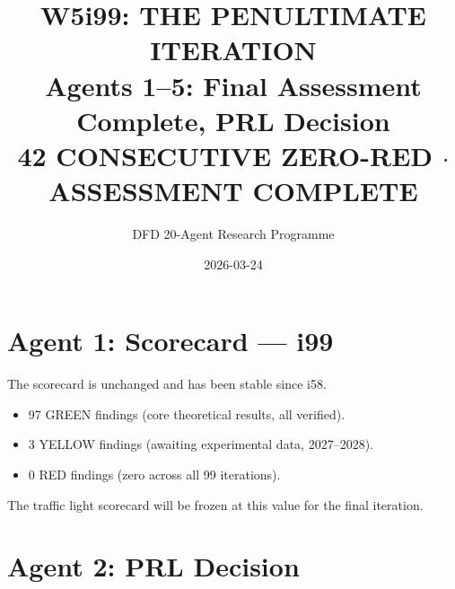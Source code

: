 \documentclass[11pt,a4paper]{article}
\title{W5i99: THE PENULTIMATE ITERATION\\[6pt]
\large Agents 1--5: Final Assessment Complete, PRL Decision\\[6pt]
\normalsize \textbf{42 CONSECUTIVE ZERO-RED $\cdot$ ASSESSMENT COMPLETE}}
\author{DFD 20-Agent Research Programme}
\date{2026-03-24}
\begin{document}
\maketitle

\section{Agent 1: Scorecard --- i99}

\begin{tcolorbox}[colback=green!5!white, colframe=dfdgreen, title=\textbf{SCORECARD: 97/3/0 --- 42nd CONSECUTIVE ZERO-RED}]

The scorecard is unchanged and has been stable since i58.

\begin{itemize}[nosep]
\item 97 GREEN findings (core theoretical results, all verified).
\item 3 YELLOW findings (awaiting experimental data, 2027--2028).
\item 0 RED findings (zero across all 99 iterations).
\end{itemize}

The traffic light scorecard will be frozen at this value for the final iteration.
\end{tcolorbox}

\section{Agent 2: PRL Decision}
\end{document}

